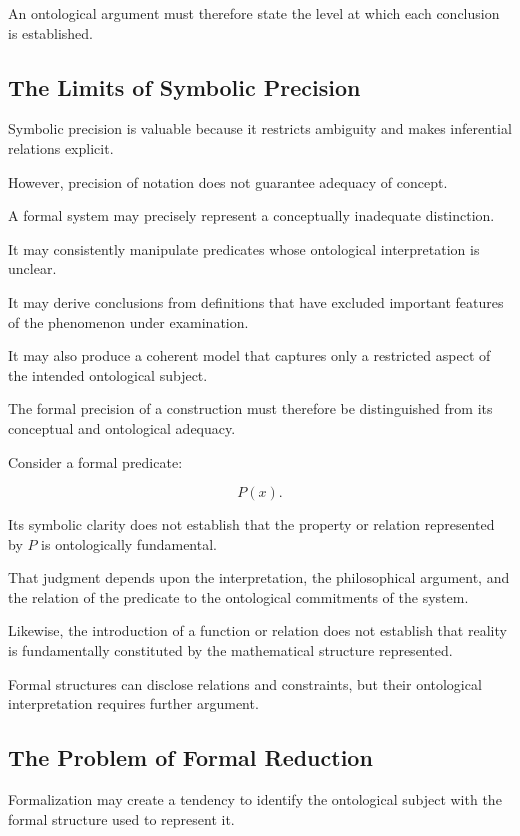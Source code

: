 An ontological argument
must therefore state
the level at
which each
conclusion is
established.

\subsection{The Limits of Symbolic Precision}

Symbolic precision
is valuable because
it restricts ambiguity
and makes inferential
relations explicit.

However, precision
of notation does
not guarantee
adequacy of concept.

A formal system
may precisely
represent a
conceptually inadequate
distinction.

It may consistently
manipulate predicates
whose ontological
interpretation is
unclear.

It may derive
conclusions from
definitions that
have excluded
important features
of the phenomenon
under examination.

It may also
produce a coherent
model that
captures only
a restricted
aspect of
the intended
ontological subject.

The formal precision
of a construction
must therefore
be distinguished
from its conceptual
and ontological
adequacy.

Consider a formal
predicate:

\[
    P(x).
\]

Its symbolic
clarity does
not establish
that the
property or
relation represented
by \(P\)
is ontologically
fundamental.

That judgment
depends upon
the interpretation,
the philosophical
argument, and
the relation
of the predicate
to the ontological
commitments of
the system.

Likewise, the
introduction of
a function or
relation does
not establish
that reality
is fundamentally
constituted by
the mathematical
structure represented.

Formal structures
can disclose
relations and
constraints, but
their ontological
interpretation requires
further argument.

\subsection{The Problem of Formal Reduction}

Formalization may
create a tendency
to identify
the ontological
subject with
the formal
structure used
to represent it.

